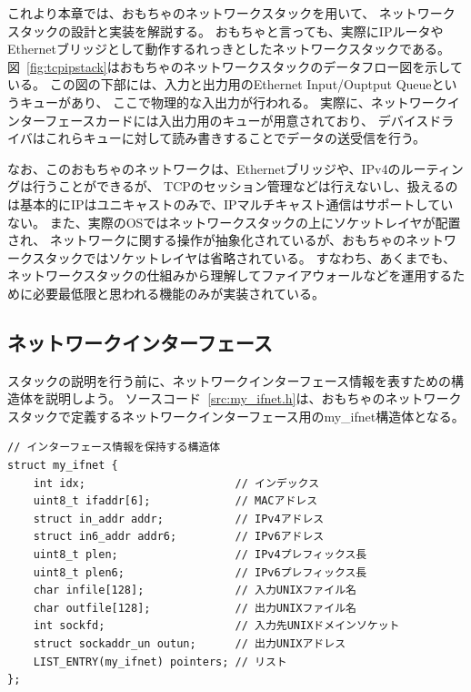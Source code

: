 これより本章では、おもちゃのネットワークスタックを用いて、
ネットワークスタックの設計と実装を解説する。
おもちゃと言っても、実際にIPルータやEthernetブリッジとして動作するれっきとしたネットワークスタックである。
図~\ref{fig:tcpipstack}はおもちゃのネットワークスタックのデータフロー図を示している。
この図の下部には、入力と出力用のEthernet Input/Ouptput Queueというキューがあり、
ここで物理的な入出力が行われる。
実際に、ネットワークインターフェースカードには入出力用のキューが用意されており、
デバイスドライバはこれらキューに対して読み書きすることでデータの送受信を行う。

なお、このおもちゃのネットワークは、Ethernetブリッジや、IPv4のルーティングは行うことができるが、
TCPのセッション管理などは行えないし、扱えるのは基本的にIPはユニキャストのみで、IPマルチキャスト通信はサポートしていない。
また、実際のOSではネットワークスタックの上にソケットレイヤが配置され、
ネットワークに関する操作が抽象化されているが、おもちゃのネットワークスタックではソケットレイヤは省略されている。
すなわち、あくまでも、ネットワークスタックの仕組みから理解してファイアウォールなどを運用するために必要最低限と思われる機能のみが実装されている。

\subsection{ネットワークインターフェース} \label{sec:nwif}

スタックの説明を行う前に、ネットワークインターフェース情報を表すための構造体を説明しよう。
ソースコード~\ref{src:my_ifnet.h}は、おもちゃのネットワークスタックで定義するネットワークインターフェース用のmy\_ifnet構造体となる。

\begin{lstlisting}[caption=ネットワークインターフェースを表す構造体 (my\_ifnet.h),label=src:my_ifnet.h]
// インターフェース情報を保持する構造体
struct my_ifnet {
    int idx;                       // インデックス
    uint8_t ifaddr[6];             // MACアドレス
    struct in_addr addr;           // IPv4アドレス
    struct in6_addr addr6;         // IPv6アドレス
    uint8_t plen;                  // IPv4プレフィックス長
    uint8_t plen6;                 // IPv6プレフィックス長
    char infile[128];              // 入力UNIXファイル名
    char outfile[128];             // 出力UNIXファイル名
    int sockfd;                    // 入力先UNIXドメインソケット
    struct sockaddr_un outun;      // 出力UNIXアドレス
    LIST_ENTRY(my_ifnet) pointers; // リスト
};
\end{lstlisting}

